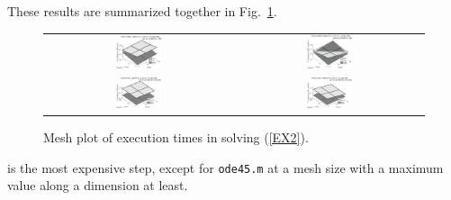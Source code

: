\documentclass[a4paper,10pt]{report}%
\begin{document}
These results are summarized together in Fig.~\ref{EX2_times3D_tol4}.
\begin{figure}[htb]
\centering
\begin{tabular}{cc}
\includegraphics[width=0.25\textwidth]{./FIGS/EX2/EX2_times3D_tol4_1.eps} &
\includegraphics[width=0.25\textwidth]{./FIGS/EX2/EX2_times3D_tol4_3.eps} \\
\includegraphics[width=0.25\textwidth]{./FIGS/EX2/EX2_times3D_tol4_2.eps} &
\includegraphics[width=0.25\textwidth]{./FIGS/EX2/EX2_times3D_tol4_4.eps}
\end{tabular}
\caption{\small Mesh plot of execution times in solving (\ref{EX2}).}
\label{EX2_times3D_tol4}
\end{figure}

\newpage
{} is the most expensive step, except for {\tt ode45.m} at a mesh size with a
maximum value along a dimension at least.



\end{document}
